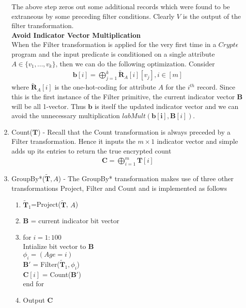 \begin{enumerate}
The above step zeros out some additional records which were found to be extraneous by some preceding filter conditions. Clearly $V$ is the output of the filter transformation.
\\\textbf{Avoid Indicator Vector Multiplication}\\
When the Filter transformation is applied for the very first time in a $Crypt\epsilon$ program and the input predicate is conditioned on a single attribute $A \in \{v_1,...,v_k\}$, then we can do the following optimization. Consider \begin{gather}\mathbf{b}[i]=\bigoplus_{j=1}^k \mathbf{\tilde{R}}_A[i][v_j], i \in [m]\end{gather} where $\mathbf{\tilde{R}}_A[i]$ is the one-hot-coding for attribute $A$ for the $i^{th}$ record. Since this is the first instance of the Filter primitive, the current indicator vector $\mathbf{B}$  will be all 1-vector. Thus $\mathbf{b}$ is itself the updated indicator vector  and we can avoid the unnecessary multiplication $labMult(\mathbf{b[i]},\mathbf{B}[i])$.   \item Count($\mathbf{T}$) - Recall that the Count transformation is always preceded by a Filter transformation. Hence it inputs the $m \times 1$ indicator vector and simple adds up its entries to return the true encrypted count  \begin{gather}\mathbf{C}=\bigoplus_{i=1}^m\mathbf{T}[i]\end{gather}%
 \item GroupBy*($\mathbf{\tilde{T}},A$) - The GroupBy* transformation   makes use of three other transformations Project, Filter and Count and is implemented as follows
\begin{enumerate} [label=(\alph*)]\item $\mathbf{\tilde{T}}_1$=Project($\mathbf{\tilde{T}}$, $A$) \item $\mathbf{B}$ =  current indicator bit vector \item  for $i = 1:100 $ \\Intialize bit vector to $\mathbf{B}$  \\$\phi_i= (Age=i) $ \\$\mathbf{B}'$ = Filter($\mathbf{\tilde{T}}_1, \phi_i$)\\ $\mathbf{C}[i]$ = Count($\mathbf{B}'$) \\ end for \item Output $\mathbf{C}$ 

\end{enumerate}
\end{enumerate}
